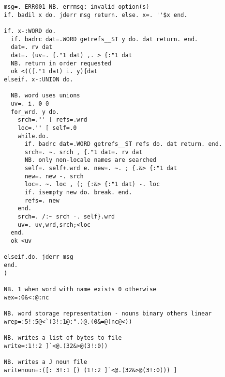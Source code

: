 \begin{lstlisting}[frame=single,framerule=0pt,basicstyle=\ttfamily\tiny]
msg=. ERR001 NB. errmsg: invalid option(s)
if. badil x do. jderr msg return. else. x=. ''$x end.

if. x-:WORD do.
  if. badrc dat=.WORD getrefs__ST y do. dat return. end.
  dat=. rv dat
  dat=. (uv=. {."1 dat) ,. > {:"1 dat
  NB. return in order requested
  ok <(({."1 dat) i. y){dat
elseif. x-:UNION do.

  NB. word uses unions
  uv=. i. 0 0
  for_wrd. y do.
    srch=.'' [ refs=.wrd
    loc=.'' [ self=.0
    while.do.
      if. badrc dat=.WORD getrefs__ST refs do. dat return. end.
      srch=. ~. srch , {."1 dat=. rv dat
      NB. only non-locale names are searched
      self=. self+.wrd e. new=. ~. ; {.&> {:"1 dat
      new=. new -. srch
      loc=. ~. loc , (; {:&> {:"1 dat) -. loc
      if. isempty new do. break. end.
      refs=. new
    end.
    srch=. /:~ srch -. self}.wrd
    uv=. uv,wrd,srch;<loc
  end.
  ok <uv

elseif.do. jderr msg
end.
)

NB. 1 when word with name exists 0 otherwise
wex=:0&<:@:nc

NB. word storage representation - nouns binary others linear
wrep=:5!:5@<`(3!:1@:".)@.(0&=@(nc@<))

NB. writes a list of bytes to file
write=:1!:2 ]`<@.(32&>@(3!:0))

NB. writes a J noun file
writenoun=:([: 3!:1 [) (1!:2 ]`<@.(32&>@(3!:0))) ]
\end{lstlisting}
